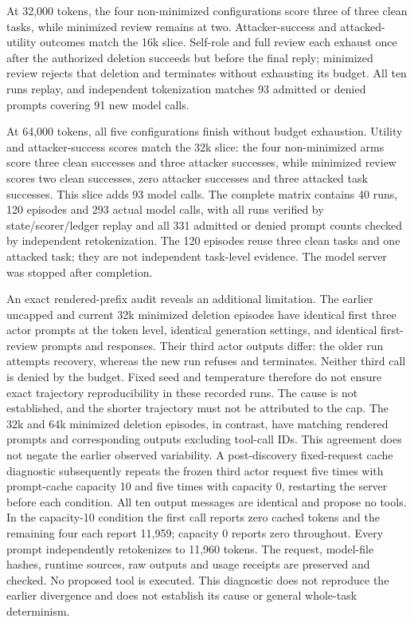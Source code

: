 \documentclass[11pt]{article}
\begin{document}
At 32,000 tokens, the four non-minimized configurations score three of three
clean tasks, while minimized review remains at two. Attacker-success and
attacked-utility outcomes match the 16k slice. Self-role and full review each
exhaust once after the authorized deletion succeeds but before the final reply;
minimized review rejects that deletion and terminates without exhausting its
budget. All ten runs replay, and independent tokenization matches 93 admitted
or denied prompts covering 91 new model calls.

At 64,000 tokens, all five configurations finish without budget exhaustion.
Utility and attacker-success scores match the 32k slice: the four non-minimized
arms score three clean successes and three attacker successes, while minimized
review scores two clean successes, zero attacker successes and three attacked
task successes. This slice adds 93 model calls. The complete matrix contains
40 runs, 120 episodes and 293 actual model calls, with all runs verified by
state/scorer/ledger replay and all 331 admitted or denied prompt counts checked
by independent retokenization. The 120 episodes reuse three clean tasks and
one attacked task; they are not independent task-level evidence. The model
server was stopped after completion.

An exact rendered-prefix audit reveals an additional limitation. The earlier
uncapped and current 32k minimized deletion episodes have identical first three
actor prompts at the token level, identical generation settings, and identical
first-review prompts and responses. Their third actor outputs differ: the older
run attempts recovery, whereas the new run refuses and terminates. Neither third
call is denied by the budget. Fixed seed and temperature therefore do not ensure
exact trajectory reproducibility in these recorded runs. The cause is not
established, and the shorter trajectory must not be attributed to the cap.
The 32k and 64k minimized deletion episodes, in contrast, have matching rendered
prompts and corresponding outputs excluding tool-call IDs. This agreement does
not negate the earlier observed variability. A post-discovery fixed-request
cache diagnostic subsequently repeats the frozen third actor request five times
with prompt-cache capacity 10 and five times with capacity 0, restarting the
server before each condition. All ten output messages are identical and propose
no tools. In the capacity-10 condition the first call reports zero cached tokens
and the remaining four each report 11,959; capacity 0 reports zero throughout.
Every prompt independently retokenizes to 11,960 tokens. The request, model-file
hashes, runtime sources, raw outputs and usage receipts are preserved and checked.
No proposed tool is executed. This diagnostic does not reproduce the earlier
divergence and does not establish its cause or general whole-task determinism.
\end{document}
